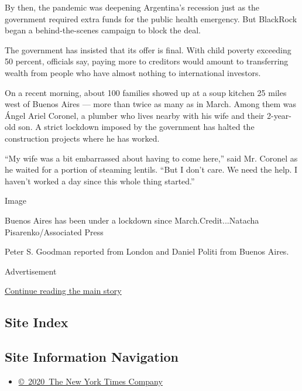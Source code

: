 By then, the pandemic was deepening Argentina's recession just as the
government required extra funds for the public health emergency. But
BlackRock began a behind-the-scenes campaign to block the deal.

The government has insisted that its offer is final. With child poverty
exceeding 50 percent, officials say, paying more to creditors would
amount to transferring wealth from people who have almost nothing to
international investors.

On a recent morning, about 100 families showed up at a soup kitchen 25
miles west of Buenos Aires --- more than twice as many as in March.
Among them was Ángel Ariel Coronel, a plumber who lives nearby with his
wife and their 2-year-old son. A strict lockdown imposed by the
government has halted the construction projects where he has worked.

``My wife was a bit embarrassed about having to come here,'' said Mr.
Coronel as he waited for a portion of steaming lentils. ``But I don't
care. We need the help. I haven't worked a day since this whole thing
started.''

Image

Buenos Aires has been under a lockdown since March.Credit...Natacha
Pisarenko/Associated Press

Peter S. Goodman reported from London and Daniel Politi from Buenos
Aires.

Advertisement

\protect\hyperlink{after-bottom}{Continue reading the main story}

\hypertarget{site-index}{%
\subsection{Site Index}\label{site-index}}

\hypertarget{site-information-navigation}{%
\subsection{Site Information
Navigation}\label{site-information-navigation}}

\begin{itemize}
\tightlist
\item
  \href{https://help.nytimes.com/hc/en-us/articles/115014792127-Copyright-notice}{©~2020~The
  New York Times Company}
\end{itemize}

